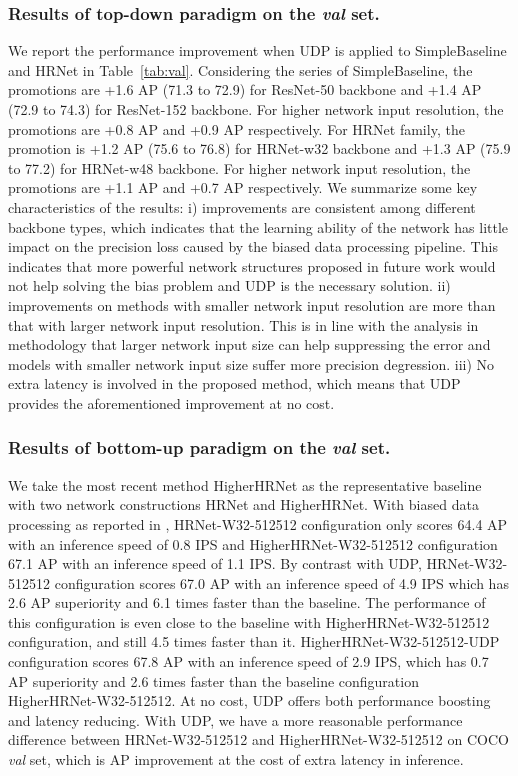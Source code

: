 \documentclass[10pt,journal,compsoc]{IEEEtran}
\begin{document}
\subsubsection{Results of top-down paradigm on the \textit{val} set.}
We report the performance improvement when UDP is applied to SimpleBaseline \cite{SBNet} and HRNet \cite{HRNet} in Table~\ref{tab:val}.
Considering the series of SimpleBaseline, the promotions are +1.6 AP (71.3 to 72.9) for ResNet-50 backbone and +1.4 AP (72.9 to 74.3) for ResNet-152 backbone. For higher network input resolution, the promotions are +0.8 AP and +0.9 AP respectively.
For HRNet family, the promotion is +1.2 AP (75.6 to 76.8) for HRNet-w32 backbone and +1.3 AP (75.9 to 77.2) for HRNet-w48 backbone. For higher network input resolution, the promotions are +1.1 AP and +0.7 AP respectively.
We summarize some key characteristics of the results: i) improvements are consistent among different backbone types, which indicates that the learning ability of the network has little impact on the precision loss caused by the biased data processing pipeline. This indicates that more powerful network structures proposed in future work would not help solving the bias problem and UDP is the necessary solution. ii) improvements on methods with smaller network input resolution are more than that with larger network input resolution. This is in line with the analysis in methodology that larger network input size can help suppressing the error and models with smaller network input size suffer more precision degression. iii) No extra latency is involved in the proposed method, which means that UDP provides the aforementioned improvement at no cost.

\subsubsection{Results of bottom-up paradigm on the \textit{val} set.}
We take the most recent method HigherHRNet \cite{Higher} as the representative baseline with two network constructions HRNet and HigherHRNet. With biased data processing as reported in \cite{Higher}, HRNet-W32-512512 configuration only scores 64.4 AP with an inference speed of 0.8 IPS and HigherHRNet-W32-512512 configuration 67.1 AP with an inference speed of 1.1 IPS. By contrast with UDP, HRNet-W32-512512 configuration scores 67.0 AP with an inference speed of 4.9 IPS which has 2.6 AP superiority and 6.1 times faster than the baseline. The performance of this configuration is even close to the baseline with HigherHRNet-W32-512512 configuration, and still 4.5 times faster than it. HigherHRNet-W32-512512-UDP configuration scores 67.8 AP with an inference speed of 2.9 IPS, which has 0.7 AP superiority and 2.6 times faster than the baseline configuration HigherHRNet-W32-512512. At no cost, UDP offers both performance boosting and latency reducing. With UDP, we have a more reasonable performance difference between HRNet-W32-512512 and HigherHRNet-W32-512512 on COCO \textit{val} set, which is  AP improvement at the cost of  extra latency in inference.
\end{document}
